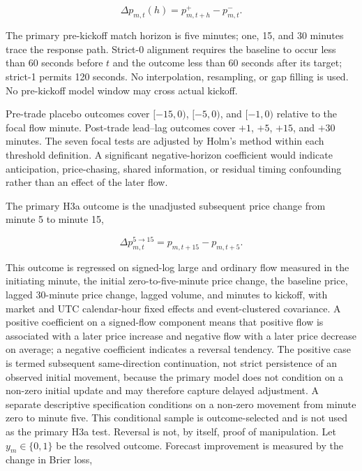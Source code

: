 \begin{equation}
  \Delta p_{m,t}(h)=p^+_{m,t+h}-p^-_{m,t}.
\end{equation}

The primary pre-kickoff match horizon is five minutes; one, 15, and 30 minutes
trace the response path. Strict-0 alignment requires the baseline to occur less
than 60 seconds before $t$ and the outcome less than 60 seconds after its target;
strict-1 permits 120 seconds. No interpolation, resampling, or gap filling is
used. No pre-kickoff model window may cross actual kickoff.

Pre-trade placebo outcomes cover $[-15,0)$, $[-5,0)$, and $[-1,0)$ relative
to the focal flow minute. Post-trade lead--lag outcomes cover $+1$, $+5$,
$+15$, and $+30$ minutes. The seven focal tests are adjusted by Holm's method
within each threshold definition. A significant negative-horizon coefficient
would indicate anticipation, price-chasing, shared information, or residual
timing confounding rather than an effect of the later flow.

The primary H3a outcome is the unadjusted subsequent price change from minute 5
to minute 15,

\begin{equation}
  \Delta p^{5\rightarrow15}_{m,t}=p_{m,t+15}-p_{m,t+5}.
\end{equation}

This outcome is regressed on signed-log large and ordinary flow measured in the
initiating minute, the initial zero-to-five-minute price change, the baseline
price, lagged 30-minute price change, lagged volume, and minutes to kickoff,
with market and UTC calendar-hour fixed effects and event-clustered covariance.
A positive coefficient on a signed-flow component means that positive flow is
associated with a later price increase and negative flow with a later price
decrease on average; a negative coefficient indicates a reversal tendency.
The positive case is termed subsequent same-direction continuation, not strict
persistence of an observed initial movement, because the primary model does not
condition on a non-zero initial update and may therefore capture delayed
adjustment. A separate descriptive specification conditions on a non-zero
movement from minute zero to minute five. This conditional sample is
outcome-selected and is not used as the primary H3a test. Reversal is not, by
itself, proof of manipulation. Let $y_m\in\{0,1\}$ be the resolved outcome.
Forecast improvement is measured by the change in Brier loss,

